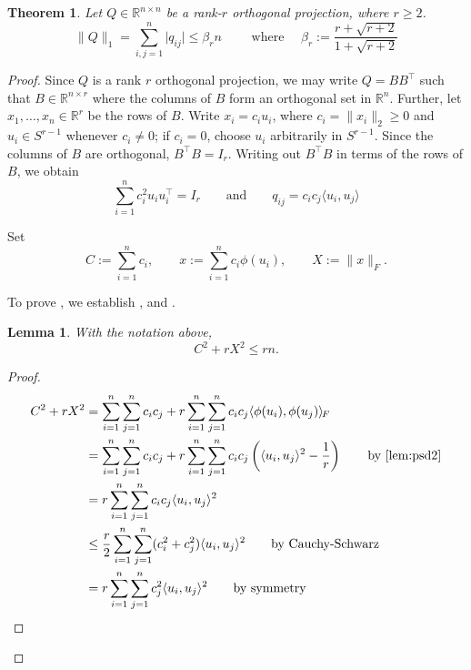 \documentclass[12pt]{amsart}
\newtheorem{theorem}{Theorem}[section]
\newtheorem{lemma}[lemma]{Lemma}
\theoremstyle{myremark}
\DeclareMathOperator{\tr}{tr}
\newcommand{\R}{\mathbb{R}}
\newcommand{\1}{\mathbf{1}}
\newcommand{\inner}[2]{\langle #1,#2\rangle}
\newcommand{\froinner}[2]{\langle #1,#2\rangle_{\!F}}
\newcommand{\norm}[1]{\lVert #1\rVert}
\newcommand{\abs}[1]{\lvert #1\rvert}
\begin{document}
\begin{theorem}\label{thm:l1-proj}
Let \(Q\in \R^{n\times n}\) be a rank-\(r\) orthogonal projection, where \(r\ge 2\). 
\[
\|Q\|_1=\sum_{i,j=1}^n \abs{q_{ij}}
\le \beta_r n \qquad \text{ where } \quad \beta_r:=\frac{r+\sqrt{r+2}}{1+\sqrt{r+2}}
\]
\end{theorem}
\begin{proof}
Since $Q$ is a rank $r$ orthogonal projection, we may write $Q = BB^\top$ such that $B \in \R^{n\times r}$ where the columns of $B$ form an orthogonal set in $\R^n$. Further, let $x_1,\ldots,x_n \in \R^r$ be the rows of $B$. Write $x_i=c_i u_i$, where $c_i=\norm{x_i}_2\ge 0$ and $u_i\in S^{r-1}$ whenever $c_i\ne 0$; if $c_i=0$, choose $u_i$ arbitrarily in $S^{r-1}$. Since the columns of $B$ are orthogonal, $B^\top B = I_r$. Writing out $B^\top B$ in terms of the rows of $B$, we obtain
\begin{equation}\label{eq:projection-model}
\sum_{i=1}^n c_i^2 u_i u_i^\top=I_r 
\qquad\text{and}\qquad
q_{ij}=c_i c_j\inner{u_i}{u_j}
\end{equation}




Set
\[
C:=\sum_{i=1}^n c_i,
\qquad
x:=\sum_{i=1}^n c_i\phi(u_i),
\qquad
X:=\norm{x}_F.
\]

To prove , we establish ,  and .

\begin{lemma}\label{lem:CS-ineq}
With the notation above,
\[
C^2+rX^2\le rn.
\]
\end{lemma}

\begin{proof}
\begin{align*}
C^2 + rX^2
&= \sum_{i=1}^n \sum_{j=1}^n c_i c_j + r \sum_{i=1}^n \sum_{j=1}^n c_i c_j \froinner{\phi(u_i)}{\phi(u_j)}\\
&= \sum_{i=1}^n \sum_{j=1}^n c_i c_j + r \sum_{i=1}^n \sum_{j=1}^n c_i c_j \left(\inner{u_i}{u_j}^2 - \frac{1}{r}\right) \text{\qquad by \Cref{lem:psd2}}\\
&= r \sum_{i=1}^n \sum_{j=1}^n c_i c_j \inner{u_i}{u_j}^2\\
&\leq \frac{r}{2}\sum_{i=1}^n \sum_{j=1}^n (c_i^2 + c_j^2) \inner{u_i}{u_j}^2 \text{\qquad by Cauchy-Schwarz}\\
&= r \sum_{i=1}^n \sum_{j=1}^n c_j^2 \inner{u_i}{u_j}^2 \text{\qquad by symmetry}
\end{align*}


\end{proof}
\end{proof}
\end{document}
